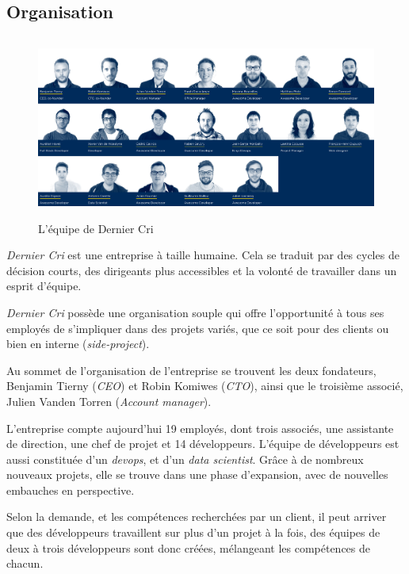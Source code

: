 \bigskip

\subsection{Organisation}\label{organisation}

\begin{figure}[h]
  \centering
  \includegraphics[height=6cm]{figures/team.png}
  \caption{L'équipe de Dernier Cri}
\end{figure}

\bigskip

\emph{Dernier Cri} est une entreprise à taille humaine. Cela se traduit
par des cycles de décision courts, des dirigeants plus accessibles et la
volonté de travailler dans un esprit d'équipe.

\bigskip

\emph{Dernier Cri} possède une organisation souple qui offre
l'opportunité à tous ses employés de s'impliquer dans des projets
variés, que ce soit pour des clients ou bien en interne
(\emph{side-project}).

\bigskip

Au sommet de l'organisation de l'entreprise se trouvent les deux
fondateurs, Benjamin Tierny (\emph{CEO}) et Robin Komiwes (\emph{CTO}),
ainsi que le troisième associé, Julien Vanden Torren (\emph{Account
manager}).

\bigskip

L'entreprise compte aujourd'hui 19 employés, dont trois associés, une
assistante de direction, une chef de projet et 14 développeurs. L'équipe
de développeurs est aussi constituée d'un \emph{devops}, et d'un
\emph{data scientist}. Grâce à de nombreux nouveaux projets, elle se
trouve dans une phase d'expansion, avec de nouvelles embauches en
perspective.

\bigskip

Selon la demande, et les compétences recherchées par un client, il peut
arriver que des développeurs travaillent sur plus d'un projet à la fois,
des équipes de deux à trois développeurs sont donc créées, mélangeant
les compétences de chacun.

